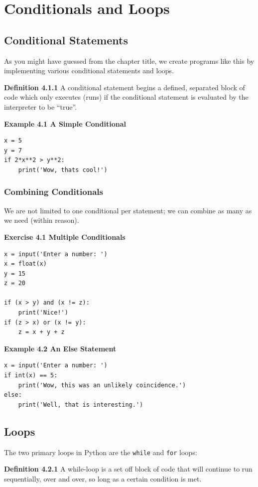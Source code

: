 \chapter{Conditionals and Loops}

\section{Conditional Statements}
As you might have guessed from the chapter title, we create programs like this by implementing various conditional statements and loops.

\textbf{Definition 4.1.1} A conditional statement begins a defined, separated block of code which only executes (runs) if the conditional statement is evaluated by the interpreter to be ``true''.

\textbf{Example 4.1 A Simple Conditional}
\begin{lstlisting}
x = 5
y = 7
if 2*x**2 > y**2:
    print('Wow, thats cool!')
\end{lstlisting}

\subsection{Combining Conditionals}
We are not limited to one conditional per statement; we can combine as many as we need (within reason).

\textbf{Exercise 4.1 Multiple Conditionals}
\begin{lstlisting}
x = input('Enter a number: ')
x = float(x)
y = 15
z = 20

if (x > y) and (x != z):
    print('Nice!')
if (z > x) or (x != y):
    z = x + y + z
\end{lstlisting}

\textbf{Example 4.2 An Else Statement}
\begin{lstlisting}
x = input('Enter a number: ')
if int(x) == 5:
    print('Wow, this was an unlikely coincidence.')
else:
    print('Well, that is interesting.')
\end{lstlisting}

\section{Loops}
The two primary loops in Python are the \texttt{while} and \texttt{for} loops:

\textbf{Definition 4.2.1} A while-loop is a set off block of code that will continue to run sequentially, over and over, so long as a certain condition is met.

